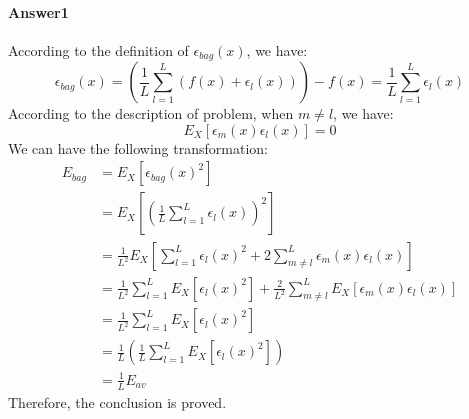 \documentclass[paper=a4, fontsize=11pt]{scrartcl} %
\numberwithin{equation}{section} %
\numberwithin{figure}{section} %
\numberwithin{table}{section} %
\begin{document}
\paragraph{\textbf{Answer1}}
According to the definition of $\epsilon _{bag}\left ( x \right )$, we have:
\begin{equation*}
\epsilon _{bag}\left ( x \right )=\left ( \frac{1}{L}\sum_{l=1}^{L}\left ( f\left ( x \right )+\epsilon _{l}\left ( x \right ) \right ) \right )-f\left ( x \right )=\frac{1}{L}\sum_{l=1}^{L}\epsilon _{l}\left ( x \right )
\end{equation*}
According to the description of problem, when $m\neq l$, we have:
\begin{equation*}
E_{X}\left [ \epsilon _{m}\left ( x \right )\epsilon _{l}\left ( x \right ) \right ]=0
\end{equation*}
We can have the following transformation:
\begin{align*}
E_{bag}&=E_{X}\left [ \epsilon _{bag}\left ( x \right )^{2} \right ]
\\ &=E_{X}\left [ \left ( \frac{1}{L}\sum_{l=1}^{L}\epsilon _{l}\left ( x \right ) \right )^{2} \right ]
\\ &=\frac{1}{L^{2}}E_{X}\left [ \sum_{l=1}^{L}\epsilon _{l}\left ( x \right )^{2}+2\sum_{m\neq l}^{L}\epsilon _{m}\left ( x \right )\epsilon _{l}\left ( x \right )  \right ]
\\ &=\frac{1}{L^{2}}\sum_{l=1}^{L}E_{X}\left [ \epsilon _{l}\left ( x \right )^{2} \right ]+\frac{2}{L^{2}}\sum_{m\neq l}^{L}E_{X}\left [ \epsilon _{m}\left ( x \right )\epsilon _{l}\left ( x \right ) \right ]
\\ &=\frac{1}{L^{2}}\sum_{l=1}^{L}E_{X}\left [ \epsilon _{l}\left ( x \right )^{2} \right ]
\\ &=\frac{1}{L}\left ( \frac{1}{L}\sum_{l=1}^{L}E_{X}\left [ \epsilon _{l}\left ( x \right )^{2} \right ] \right )
\\ &=\frac{1}{L}E_{av}
\end{align*}
Therefore, the conclusion is proved.
\end{document}
